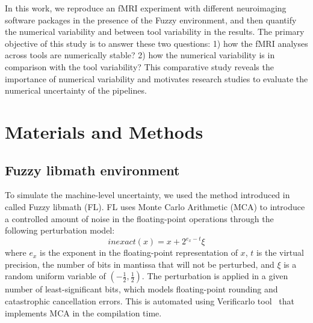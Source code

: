 \documentclass[conference]{IEEEtran}
\begin{document}
In this work, we reproduce an fMRI experiment with different neuroimaging software packages in the presence of the Fuzzy environment,
and then quantify the numerical variability and between tool variability in the results. 
The primary objective of this study is to answer these two questions: 1) how the fMRI analyses across tools are numerically stable?
2) how the numerical variability is in comparison with the tool variability?
This comparative study reveals the importance of numerical variability and motivates research studies to evaluate the numerical uncertainty of the pipelines.
  


\section{Materials and Methods}

\subsection{Fuzzy libmath environment}

To simulate the machine-level uncertainty, we used the method introduced in~\cite{salari2021accurate} called Fuzzy libmath (FL).
FL uses Monte Carlo Arithmetic (MCA) to introduce a controlled amount of noise in the floating-point operations
through the following perturbation model:
\begin{equation} \label{eq:mca_inexact}
  inexact(x) = x + 2^{e_x-t}\xi
\end{equation}
where $e_x$ is the exponent in the floating-point representation of $x$,
$t$ is the virtual precision, the number of bits in mantissa that will not be perturbed,
and $\xi$ is a random uniform variable of $(-\frac{1}{2}, \frac{1}{2})$.
The perturbation is applied in a given number of least-significant bits,
which models floating-point rounding and catastrophic cancellation errors.
This is automated using Verificarlo tool~\cite{denis2015verificarlo} that implements MCA in the compilation time.
\end{document}
